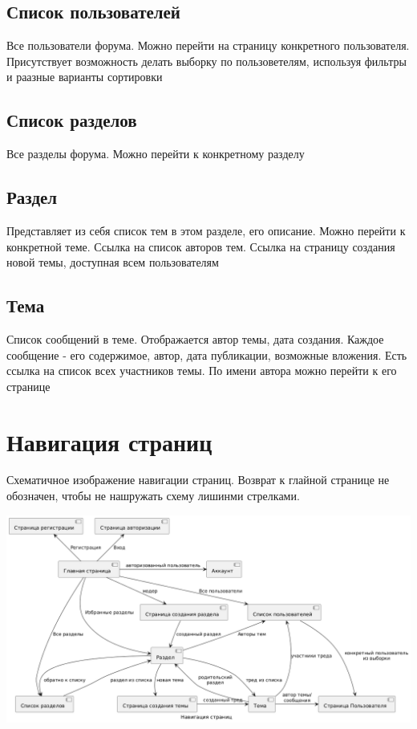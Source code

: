 \documentclass[a4paper, 12pt]{article}
\begin{document}
	\subsection{Список пользователей}
		Все пользователи форума. Можно перейти на страницу конкретного пользователя. Присутствует возможность делать выборку по пользоветелям, используя фильтры и раазные варианты сортировки
		
	\subsection{Список разделов}
		Все разделы форума. Можно перейти к конкретному разделу
		
	\subsection{Раздел}
		Представляет из себя список тем в этом разделе, его описание. Можно перейти к конкретной теме. Ссылка на список авторов тем. Ссылка на страницу создания новой темы, доступная всем пользователям
	\subsection{Тема}
		Список сообщений в теме. Отображается автор темы, дата создания. Каждое сообщение - его содержимое, автор, дата публикации, возможные вложения. Есть ссылка на список всех участников темы. По имени автора можно перейти к его странице
		
\section{Навигация страниц}
	Схематичное изображение навигации страниц. Возврат к глайной странице не обозначен, чтобы не нашружать схему лишинми стрелками.
	
	\includegraphics[width=\textwidth]{navigation1}
		
\end{document}
